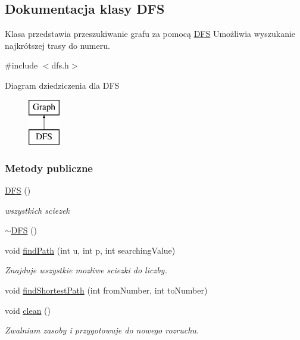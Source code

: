 \hypertarget{class_d_f_s}{\subsection{Dokumentacja klasy D\-F\-S}
\label{class_d_f_s}
}


Klasa przedstawia przeszukiwanie grafu za pomocą \hyperlink{class_d_f_s}{D\-F\-S} Umożliwia wyszukanie najkrótszej trasy do numeru.  




{\ttfamily \#include $<$dfs.\-h$>$}

Diagram dziedziczenia dla D\-F\-S\begin{figure}[H]
\begin{center}
\leavevmode
\includegraphics[height=2.000000cm]{class_d_f_s}
\end{center}
\end{figure}
\subsubsection*{Metody publiczne}
\begin{DoxyCompactItemize}
\item 
\hyperlink{class_d_f_s_a75b2f0e0042913c0a0a800e3d6c34f37}{D\-F\-S} ()
\begin{DoxyCompactList}\small\item\em wszystkich sciezek \end{DoxyCompactList}\item 
\hyperlink{class_d_f_s_aa013205788e77bad8ea56e138420c1ea}{$\sim$\-D\-F\-S} ()
\item 
void \hyperlink{class_d_f_s_a1d8f16ae45bf27ea6681236f5a4ba7f9}{find\-Path} (int u, int p, int searching\-Value)
\begin{DoxyCompactList}\small\item\em Znajduje wszystkie mozliwe sciezki do liczby. \end{DoxyCompactList}\item 
void \hyperlink{class_d_f_s_a7243745e5d6162b7106803ac1cd70d91}{find\-Shortest\-Path} (int from\-Number, int to\-Number)
\item 
void \hyperlink{class_d_f_s_ac335b86dce7cfab6655ca7eeaf2f9e10}{clean} ()
\begin{DoxyCompactList}\small\item\em Zwalniam zasoby i przygotowuje do nowego rozruchu. \end{DoxyCompactList}\end{DoxyCompactItemize}

